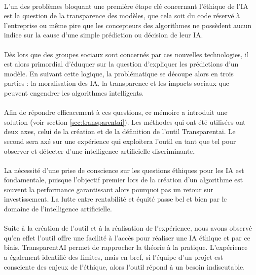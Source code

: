 \documentclass[10pt, french, a4paper]{report}
\begin{document}
\paragraph{}
L’un des problèmes bloquant une première étape clé concernant l’éthique de l’IA est la question de la transparence des modèles, que cela soit du code réservé à l’entreprise ou même pire que les concepteurs des algorithmes ne possèdent aucun indice sur la cause d’une simple prédiction ou décision de leur IA.

\paragraph{}
Dès lors que des groupes sociaux sont concernés par ces nouvelles technologies, il est alors primordial d’éduquer sur la question d’expliquer les prédictions d’un modèle. En suivant cette logique, la problématique se découpe alors en trois parties : la moralisation des IA, la transparence et les impacts sociaux que peuvent engendrer les algorithmes intelligents.

\paragraph{}
Afin de répondre efficacement à ces questions, ce mémoire a introduit une solution (voir section \ref{sec:transparentai}). Les méthodes qui ont été utilisées ont deux axes, celui de la création et de la définition de l'outil Transparentai. Le second sera axé sur une expérience qui exploitera l'outil en tant que tel pour observer et détecter d'une intelligence artificielle discriminante.

\paragraph{}
La nécessité d’une prise de conscience sur les questions éthiques pour les IA est fondamentale, puisque l’objectif premier lors de la création d'un algorithme est souvent la performance garantissant alors pourquoi pas un retour sur investissement. La lutte entre rentabilité et équité passe bel et bien par le domaine de l’intelligence artificielle.

\paragraph{}
Suite à la création de l'outil et à la réalisation de l'expérience, nous avons observé qu'en effet l'outil offre une facilité à l'accès pour réaliser une IA éthique et par ce biais, TransparentAI permet de rapprocher la théorie à la pratique. L'expérience a également identifié des limites, mais en bref, si l'équipe d'un projet est consciente des enjeux de l'éthique, alors l'outil répond à un besoin indiscutable.
\end{document}
